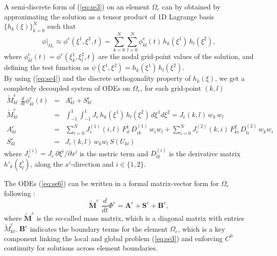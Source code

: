 \documentclass{agujournal}
\begin{document}
  A semi-discrete  form of  (\ref{eq:se3})  on an  element $\Omega_e$ can by obtained by
   approximating the solution  as a tensor product of  1D Lagrange basis  $\{ h_k(\xi)\}_{k=0}^N$ such that
 \begin{equation}
     \phi |_{\Omega_e} \approx  \phi^e(\xi^1,\xi^2,t) =  
              \sum_{k=0}^{N}   \sum_{l=0}^{N}  \phi^e_{kl}(t)  \, h_k(\xi^1) \, h_l(\xi^2),  \label{eq:se60}
 \end{equation}
 where $\phi^e_{kl}(t) = \phi^e(\xi_k^1, \xi_l^2,t) $ are  the nodal grid-point values of the solution, and  defining the  test function as
  $\psi(\xi^1,\xi^2) = h_k(\xi^1) \, h_l(\xi^2)$.\\ 


 By using (\ref{eq:se4}) and the discrete orthogonality property of $h_k(\xi)$, 
  we get a completely decoupled system of ODEs on  $\Omega_e$,  for each grid-point $(k,l)$ 
  \begin{eqnarray}
      \widetilde M^e_{kl}\, \, \frac{d }{dt} \phi^e_{kl}(t) &= &  A^e_{kl}    + S^e_{kl}  \label{eq:se6} \\
        \widetilde M^e_{kl}  &=  & \int_{-1}^{1} \int_{-1}^{1} J_e  \, h_k(\xi^1)  \, h_l(\xi^2) \, d\xi^1  d\xi^2 = J_e(k,l) \, w_k \, w_l \\
          A^e_{kl}  &=  & \sum_{i=0}^N  J^{(1)}_e(i,l) \,  F^1_{i l} \, D_{ik}^{(1)}\, w_i  w_l  +
           \sum_{i=0}^N  J^{(2)}_e(k, i) \,  F^2_{k i} \, D_{l i}^{(2)} \, w_k  w_i \\
           S^e_{kl}  &=   &J_e(k,l) \, w_k w_l  \, S(U_{kl})
  \end{eqnarray}  
   where $J^{(i)}_e = J_e \,\partial \xi^i / \partial x^i$ is the metric term  and 
   $D^{(i)}_{lk}$ is the  derivative matrix $h'_k(\xi^i_l)$, 
  along the $x^i$-direction and  $ i \in \{1,  2\}$. 

 The ODEs  (\ref{eq:se6}) can be written in a formal matrix-vector form
  for  $\Omega_e$  following
  \cite{KS2013book}: 
 \begin{equation}
    \widetilde{\mathbf{M}}^e\, \, \frac{d }{dt} \Phi^e =   \mathbf{A}^e    + \mathbf{S}^e + \mathbf{B}^e,  \label{eq:se7} 
 \end{equation}
      where $\widetilde{\mathbf{M}}^e$ is the  so-called mass matrix,  which  is a diagonal  matrix with entries $\widetilde M^e_{kl}$.    $\mathbf{B}^e$
  indicates the boundary terms for the element 
  $\Omega_e$, which is a key component linking  the local and global problem (\ref{eq:se3}) and enforcing $C^0$ continuity
  for solutions across element boundaries.  
  
\end{document}
